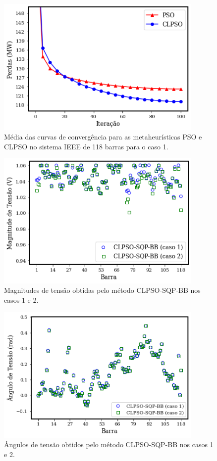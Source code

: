 \documentclass[
	12pt,				%
	openany,			%
	twoside,			%
	a4paper,			%
	chapter=TITLE,		%
	section=Title,		%
	subsection=Title,	%
	subsubsection=Title,%
	english,			%
	french,				%
	spanish,			%
	brazil			%
	]{abntex2}
\begin{document}
\begin{ERRATA}
\pagebreak

\begin{figure}[h!]
    \caption{\label{ieee_1181_curves}Média das curvas de convergência para as metaheurísticas PSO e CLPSO no sistema IEEE de 118 barras para o caso 1.}
    \centering
    \includegraphics[width=100mm]{images/convergence_curves_ieee118_1.png}
   
\end{figure}

\begin{figure}[h!]
    \caption{\label{tensao11812}Magnitudes de tensão obtidas pelo método CLPSO-SQP-BB nos casos 1 e 2.}
    \centering
    \includegraphics[width=100mm]{images/tensao_ieee118_hibrido.png}
   
\end{figure}

\pagebreak

\begin{figure}[h!]
    \caption{\label{angulo11812}Ângulos de tensão obtidos pelo método CLPSO-SQP-BB nos casos 1 e 2.}
    \centering
    \includegraphics[width=100mm]{images/angulo_ieee118_hibrido.png}
   

\end{figure}
\end{ERRATA}
\end{document}
